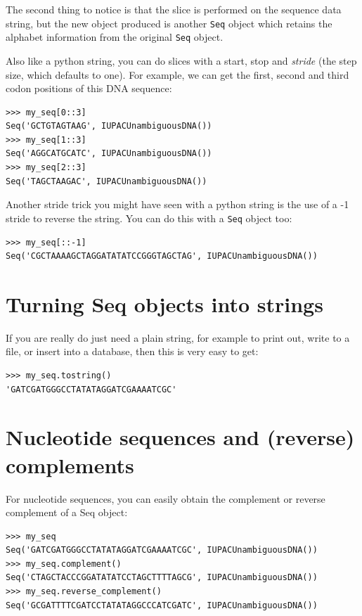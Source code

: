 \documentclass{report}
\begin{document}
The second thing to notice is that the slice is performed on the sequence data string, but the new object produced is another \verb|Seq| object which retains the alphabet information from the original \verb|Seq| object.

Also like a python string, you can do slices with a start, stop and \emph{stride} (the step size, which defaults to one).  For example, we can get the first, second and third codon positions of this DNA sequence:

\begin{verbatim}
>>> my_seq[0::3]
Seq('GCTGTAGTAAG', IUPACUnambiguousDNA())
>>> my_seq[1::3]
Seq('AGGCATGCATC', IUPACUnambiguousDNA())
>>> my_seq[2::3]
Seq('TAGCTAAGAC', IUPACUnambiguousDNA())
\end{verbatim}

Another stride trick you might have seen with a python string is the use of a -1 stride to reverse the string.  You can do this with a \verb|Seq| object too:

\begin{verbatim}
>>> my_seq[::-1]
Seq('CGCTAAAAGCTAGGATATATCCGGGTAGCTAG', IUPACUnambiguousDNA())
\end{verbatim}

\section{Turning Seq objects into strings}

If you are really do just need a plain string, for example to print out, write to a file, or insert into a database, then this is very easy to get:

\begin{verbatim}
>>> my_seq.tostring()
'GATCGATGGGCCTATATAGGATCGAAAATCGC'
\end{verbatim}

\section{Nucleotide sequences and (reverse) complements}
\label{sec:seq-reverse-complement}

For nucleotide sequences, you can easily obtain the complement or reverse complement of a Seq object:

\begin{verbatim}
>>> my_seq
Seq('GATCGATGGGCCTATATAGGATCGAAAATCGC', IUPACUnambiguousDNA())
>>> my_seq.complement()
Seq('CTAGCTACCCGGATATATCCTAGCTTTTAGCG', IUPACUnambiguousDNA())
>>> my_seq.reverse_complement()
Seq('GCGATTTTCGATCCTATATAGGCCCATCGATC', IUPACUnambiguousDNA())
\end{verbatim}
\end{document}
